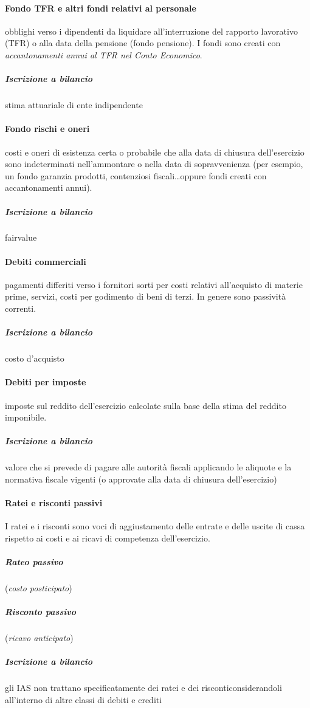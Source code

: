 \documentclass[10pt,a4paper,fleqn,oneside]{book}
\begin{document}
\paragraph{Fondo TFR e altri fondi relativi al personale} obblighi verso i dipendenti
da liquidare all’interruzione del rapporto lavorativo (\gls{TFR}) o alla data della pensione
(fondo pensione). I fondi sono creati con \emph{accantonamenti annui al TFR nel Conto Economico}.
\subparagraph{Iscrizione a bilancio} stima attuariale di ente indipendente

\paragraph{Fondo rischi e oneri} costi e oneri di esistenza certa o probabile che
alla data di chiusura dell’esercizio sono indeterminati nell’ammontare o nella data
di sopravvenienza (per esempio, un fondo  garanzia prodotti, contenziosi fiscali\dots oppure
fondi creati con accantonamenti annui).
\subparagraph{Iscrizione a bilancio} \gls{fairvalue}

\paragraph{Debiti commerciali} pagamenti differiti verso i fornitori sorti per costi
relativi all’acquisto di materie prime, servizi, costi per godimento di beni di terzi.
In genere sono passività correnti.
\subparagraph{Iscrizione a bilancio} costo d'acquisto

\paragraph{Debiti per imposte} imposte sul reddito dell’esercizio calcolate sulla
base della stima del reddito imponibile.
\subparagraph{Iscrizione a bilancio} valore che si prevede di pagare alle autorità
fiscali applicando le aliquote e la normativa fiscale vigenti (o approvate alla
data di chiusura dell’esercizio)

\paragraph{Ratei e risconti passivi} I ratei e i risconti sono voci di aggiustamento
delle entrate e delle uscite di cassa rispetto ai costi e ai ricavi di competenza dell’esercizio.
\subparagraph{Rateo passivo} (\emph{costo posticipato})
\subparagraph{Risconto passivo} (\emph{ricavo anticipato})
\subparagraph{Iscrizione a bilancio} gli IAS non trattano specificatamente dei ratei
e dei risconticonsiderandoli all'interno di altre classi di debiti e crediti


\printglossaries
\end{document}
